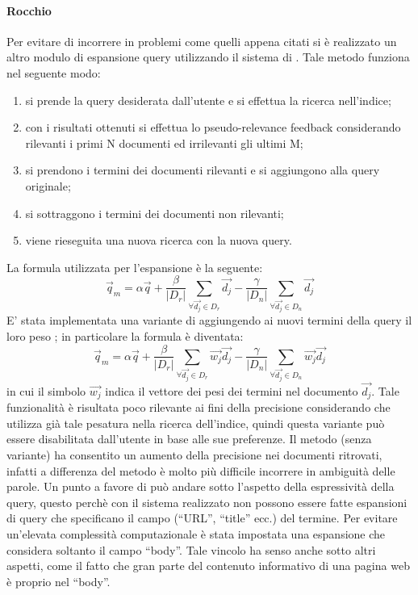 \paragraph{Rocchio}
Per evitare di incorrere in problemi come quelli appena citati si è realizzato un altro modulo di espansione query utilizzando il sistema di . Tale metodo funziona nel seguente modo:
\begin{enumerate}
\item si prende la query desiderata dall'utente e si effettua la ricerca nell'indice;
\item con i risultati ottenuti si effettua lo pseudo-relevance feedback considerando rilevanti i primi N documenti ed irrilevanti gli ultimi M;
\item si prendono i termini dei documenti rilevanti e si aggiungono alla query originale;
\item si sottraggono i termini dei documenti non rilevanti;
\item viene rieseguita una nuova ricerca con la nuova query.
\end{enumerate}
La formula utilizzata per l'espansione è la seguente:
$$
\overrightarrow{q}_{m} = \alpha\overrightarrow{q} + \dfrac{\beta}{\vert D_{r}\vert}\sum_{\forall\overrightarrow{d_{j}}\in D_{r}}\overrightarrow{d_{j}} - \dfrac{\gamma}{\vert D_{n}\vert}\sum_{\forall\overrightarrow{d_{j}}\in D_{n}}\overrightarrow{d_{j}}
$$
E' stata implementata una variante di  aggiungendo ai nuovi termini della query il loro peso ; in particolare la formula è diventata:
$$
\overrightarrow{q}_{m} = \alpha\overrightarrow{q} + \dfrac{\beta}{\vert D_{r}\vert}\sum_{\forall\overrightarrow{d_{j}}\in D_{r}}\overrightarrow{w_{j}}\overrightarrow{d_{j}} - \dfrac{\gamma}{\vert D_{n}\vert}\sum_{\forall\overrightarrow{d_{j}}\in D_{n}}\overrightarrow{w_{j}}\overrightarrow{d_{j}}
$$
in cui il simbolo $\overrightarrow{w_{j}}$ indica il vettore dei pesi  dei termini nel documento $\overrightarrow{d_{j}}$. Tale funzionalità è risultata poco rilevante ai fini della precisione considerando che  utilizza già tale pesatura nella ricerca dell'indice, quindi questa variante può essere disabilitata dall'utente in base alle sue preferenze.
Il metodo  (senza variante) ha consentito un aumento della precisione nei documenti ritrovati, infatti a differenza del metodo  è molto più difficile incorrere in ambiguità delle parole. Un punto a favore di  può andare sotto l'aspetto della espressività della query, questo perchè con il sistema  realizzato non possono essere fatte espansioni di query che specificano il campo (``URL'', ``title'' ecc.) del termine. Per evitare un'elevata complessità computazionale è stata impostata una espansione che considera soltanto il campo ``body''. Tale vincolo ha senso anche sotto altri aspetti, come il fatto che gran parte del contenuto informativo di una pagina web è proprio nel ``body''.